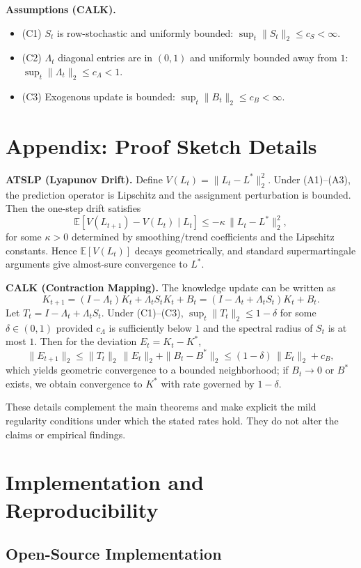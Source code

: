 \documentclass[conference]{IEEEtran}
\begin{document}
\noindent\textbf{Assumptions (CALK).}
\begin{itemize}
\item (C1) $S_t$ is row-stochastic and uniformly bounded: $\sup_t\|S_t\|_2\le c_S<\infty$.
\item (C2) $\Lambda_t$ diagonal entries are in $(0,1)$ and uniformly bounded away from $1$: $\sup_t\|\Lambda_t\|_2\le c_\Lambda<1$.
\item (C3) Exogenous update is bounded: $\sup_t\|B_t\|_2\le c_B<\infty$.
\end{itemize}

\section{Appendix: Proof Sketch Details}

\noindent\textbf{ATSLP (Lyapunov Drift).} Define $V(L_t)=\|L_t-L^*\|_2^2$. Under (A1)--(A3), the prediction operator is Lipschitz and the assignment perturbation is bounded. Then the one-step drift satisfies
\[\mathbb{E}[V(L_{t+1})-V(L_t)\mid L_t]\le -\kappa\,\|L_t-L^*\|_2^2,\]
for some $\kappa>0$ determined by smoothing/trend coefficients and the Lipschitz constants. Hence $\mathbb{E}[V(L_t)]$ decays geometrically, and standard supermartingale arguments give almost-sure convergence to $L^*$.

\noindent\textbf{CALK (Contraction Mapping).} The knowledge update can be written as
\[K_{t+1}=(I-\Lambda_t)K_t+\Lambda_t S_t K_t+B_t=(I-\Lambda_t+\Lambda_t S_t)K_t+B_t.\]
Let $T_t=I-\Lambda_t+\Lambda_t S_t$. Under (C1)--(C3), $\sup_t\|T_t\|_2\le 1-\delta$ for some $\delta\in(0,1)$ provided $c_\Lambda$ is sufficiently below $1$ and the spectral radius of $S_t$ is at most $1$. Then for the deviation $E_t=K_t-K^*$,
\[\|E_{t+1}\|_2\le \|T_t\|_2\,\|E_t\|_2+\|B_t-B^*\|_2\le (1-\delta)\,\|E_t\|_2+c_B,\]
which yields geometric convergence to a bounded neighborhood; if $B_t\to 0$ or $B^*$ exists, we obtain convergence to $K^*$ with rate governed by $1-\delta$.

\noindent These details complement the main theorems and make explicit the mild regularity conditions under which the stated rates hold. They do not alter the claims or empirical findings.

\section{Implementation and Reproducibility}

\subsection{Open-Source Implementation}
\end{document}
